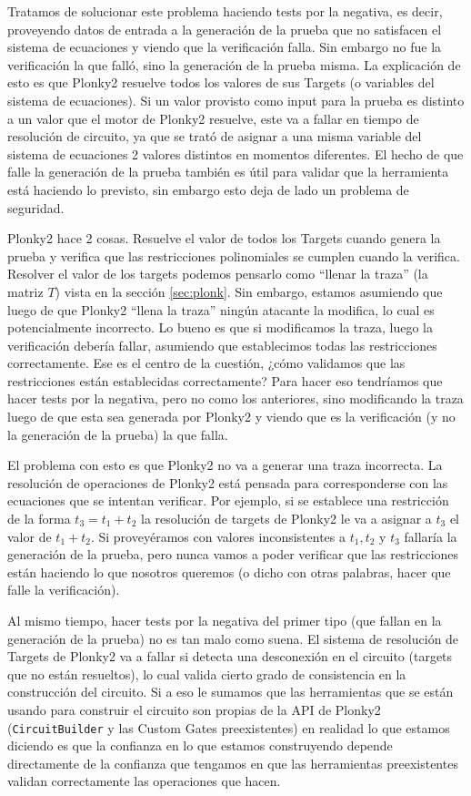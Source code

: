 \documentclass[11pt,a4paper]{tesis}
\begin{document}
Tratamos de solucionar este problema haciendo tests por la negativa, es decir, proveyendo datos de entrada a la generación de la prueba que no satisfacen el sistema de ecuaciones y viendo que la verificación falla. Sin embargo no fue la verificación la que falló, sino la generación de la prueba misma. La explicación de esto es que Plonky2 resuelve todos los valores de sus Targets (o variables del sistema de ecuaciones). Si un valor provisto como input para la prueba es distinto a un valor que el motor de Plonky2 resuelve, este va a fallar en tiempo de resolución de circuito, ya que se trató de asignar a una misma variable del sistema de ecuaciones 2 valores distintos en momentos diferentes. El hecho de que falle la generación de la prueba también es útil para validar que la herramienta está haciendo lo previsto, sin embargo esto deja de lado un problema de seguridad.

Plonky2 hace 2 cosas. Resuelve el valor de todos los Targets cuando genera la prueba y verifica que las restricciones polinomiales se cumplen cuando la verifica. Resolver el valor de los targets podemos pensarlo como ``llenar la traza'' (la matriz $T$) vista en la sección \ref{sec:plonk}. Sin embargo, estamos asumiendo que luego de que Plonky2 ``llena la traza'' ningún atacante la modifica, lo cual es potencialmente incorrecto. Lo bueno es que si modificamos la traza, luego la verificación debería fallar, asumiendo que establecimos todas las restricciones correctamente. Ese es el centro de la cuestión, ¿cómo validamos que las restricciones están establecidas correctamente? Para hacer eso tendríamos que hacer tests por la negativa, pero no como los anteriores, sino modificando la traza luego de que esta sea generada por Plonky2 y viendo que es la verificación (y no la generación de la prueba) la que falla.

El problema con esto es que Plonky2 no va a generar una traza incorrecta. La resolución de operaciones de Plonky2 está pensada para corresponderse con las ecuaciones que se intentan verificar. Por ejemplo, si se establece una restricción de la forma $t_3 = t_1 + t_2$ la resolución de targets de Plonky2 le va a asignar a $t_3$ el valor de $t_1 + t_2$. Si proveyéramos con valores inconsistentes a $t_1, t_2 \text{ y } t_3$ fallaría la generación de la prueba, pero nunca vamos a poder verificar que las restricciones están haciendo lo que nosotros queremos (o dicho con otras palabras, hacer que falle la verificación). 

Al mismo tiempo, hacer tests por la negativa del primer tipo (que fallan en la generación de la prueba) no es tan malo como suena. El sistema de resolución de Targets de Plonky2 va a fallar si detecta una desconexión en el circuito (targets que no están resueltos), lo cual valida cierto grado de consistencia en la construcción del circuito. Si a eso le sumamos que las herramientas que se están usando para construir el circuito son propias de la API de Plonky2 (\texttt{CircuitBuilder} y las Custom Gates preexistentes) en realidad lo que estamos diciendo es que la confianza en lo que estamos construyendo depende directamente de la confianza que tengamos en que las herramientas preexistentes validan correctamente las operaciones que hacen. 
\end{document}
